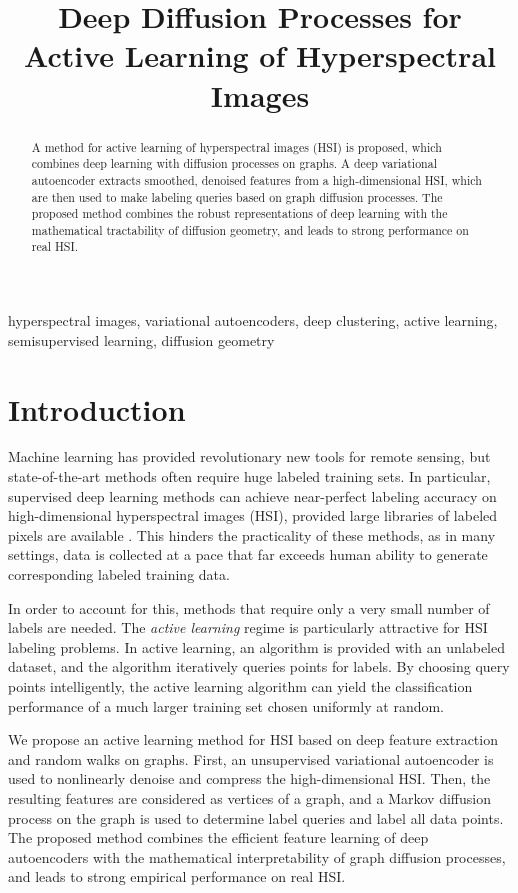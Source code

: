 \documentclass{article}
\title{Deep Diffusion Processes for Active Learning of Hyperspectral Images}
\begin{document}
\maketitle

\begin{abstract} A method for active learning of hyperspectral images (HSI) is proposed, which combines deep learning with diffusion processes on graphs.  A deep variational autoencoder extracts smoothed, denoised features from a high-dimensional HSI, which are then used to make labeling queries based on graph diffusion processes.  The proposed method combines the robust representations of deep learning with the mathematical tractability of diffusion geometry, and leads to strong performance on real HSI.  

\end{abstract}

\begin{keywords}hyperspectral images, variational autoencoders, deep clustering, active learning, semisupervised learning, diffusion geometry\end{keywords}

\section{Introduction}
\label{sec:Introduction}
 
 Machine learning has provided revolutionary new tools for remote sensing, but state-of-the-art methods often require huge labeled training sets.  In particular, supervised deep learning methods can achieve near-perfect labeling accuracy on high-dimensional hyperspectral images (HSI), provided large libraries of labeled pixels are available \cite{Zhu2017_Deep}.  This hinders the practicality of these methods, as in many settings, data is collected at a pace that far exceeds human ability to generate corresponding labeled training data.
 
 In order to account for this, methods that require only a very small number of labels are needed.  The \emph{active learning} regime is particularly attractive for HSI labeling problems.  In active learning, an algorithm is provided with an unlabeled dataset, and the algorithm iteratively queries points for labels.  By choosing query points intelligently, the active learning algorithm can yield the classification performance of a much larger training set chosen uniformly at random.  
 
 We propose an active learning method for HSI based on deep feature extraction and random walks on graphs.  First, an unsupervised variational autoencoder is used to nonlinearly denoise and compress the high-dimensional HSI.  Then, the resulting features are considered as vertices of a graph, and a Markov diffusion process on the graph is used to determine label queries and label all data points.  The proposed method combines the efficient feature learning of deep autoencoders with the mathematical interpretability of graph diffusion processes, and leads to strong empirical performance on real HSI.  
\end{document}

